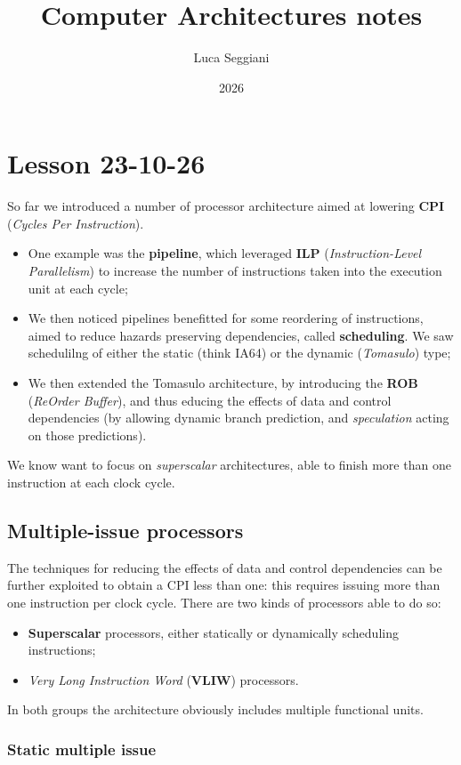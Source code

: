 \documentclass[a4paper,11pt]{article}
\title{Computer Architectures notes}
\author{Luca Seggiani}
\date{2026}
\begin{document}
\section{Lesson 23-10-26}

\thispagestyle{empty}
\pagestyle{fancy}

So far we introduced a number of processor architecture aimed at lowering \textbf{CPI} (\textit{Cycles Per Instruction}).
\begin{itemize}
	\item One example was the \textbf{pipeline}, which leveraged \textbf{ILP} (\textit{Instruction-Level Parallelism}) to increase the number of instructions taken into the execution unit at each cycle;
	\item We then noticed pipelines benefitted for some reordering of instructions, aimed to reduce hazards preserving dependencies, called \textbf{scheduling}. We saw schedulilng of either the static (think IA64) or the dynamic (\textit{Tomasulo}) type;
	\item We then extended the Tomasulo architecture, by introducing the \textbf{ROB} (\textit{ReOrder Buffer}), and thus educing the effects of data and control dependencies (by allowing dynamic branch prediction, and \textit{speculation} acting on those predictions).
\end{itemize}

We know want to focus on \textit{superscalar} architectures, able to finish more than one instruction at each clock cycle.

\subsection{Multiple-issue processors}

The techniques for reducing the effects of data and control dependencies can be further exploited to obtain a CPI less than one: this requires issuing more than one instruction per clock cycle.
There are two kinds of processors able to do so:
\begin{itemize}
	\item \textbf{Superscalar} processors, either statically or dynamically scheduling instructions;
	\item \textit{Very Long Instruction Word} (\textbf{VLIW}) processors.
\end{itemize}
In both groups the architecture obviously includes multiple functional units.

\subsubsection{Static multiple issue}
\end{document}
